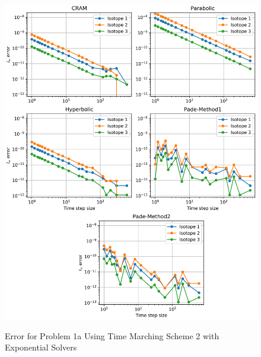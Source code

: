 \begin{figure}[t]
  \centering
  \includegraphics[width=6.5in]{images/problem1aMethod2.png}\\
  \caption{Error for Problem 1a Using Time Marching Scheme 2 with Exponential Solvers}
  \label{fig:errorProblem1aTimeMarchingScheme2}
\end{figure} 


